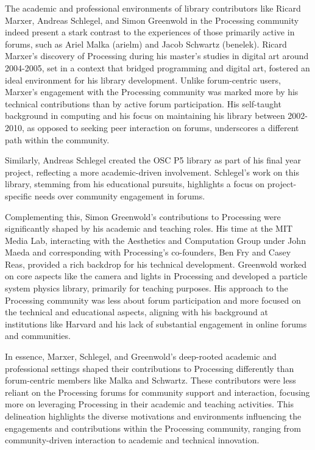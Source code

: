 The academic and professional environments of library contributors like Ricard Marxer, Andreas Schlegel, and Simon Greenwold in the Processing community indeed present a stark contrast to the experiences of those primarily active in forums, such as Ariel Malka (arielm) and Jacob Schwartz (benelek).
Ricard Marxer's discovery of Processing during his master's studies in digital art around 2004-2005, set in a context that bridged programming and digital art, fostered an ideal environment for his library development. Unlike forum-centric users, Marxer's engagement with the Processing community was marked more by his technical contributions than by active forum participation. His self-taught background in computing and his focus on maintaining his library between 2002-2010, as opposed to seeking peer interaction on forums, underscores a different path within the community​​​​.

Similarly, Andreas Schlegel created the OSC P5 library as part of his final year project, reflecting a more academic-driven involvement. Schlegel's work on this library, stemming from his educational pursuits, highlights a focus on project-specific needs over community engagement in forums​​.

Complementing this, Simon Greenwold's contributions to Processing were significantly shaped by his academic and teaching roles. His time at the MIT Media Lab, interacting with the Aesthetics and Computation Group under John Maeda and corresponding with Processing's co-founders, Ben Fry and Casey Reas, provided a rich backdrop for his technical development. Greenwold worked on core aspects like the camera and lights in Processing and developed a particle system physics library, primarily for teaching purposes. His approach to the Processing community was less about forum participation and more focused on the technical and educational aspects, aligning with his background at institutions like Harvard and his lack of substantial engagement in online forums and communities​​​​.

In essence, Marxer, Schlegel, and Greenwold's deep-rooted academic and professional settings shaped their contributions to Processing differently than forum-centric members like Malka and Schwartz. These contributors were less reliant on the Processing forums for community support and interaction, focusing more on leveraging Processing in their academic and teaching activities. This delineation highlights the diverse motivations and environments influencing the engagements and contributions within the Processing community, ranging from community-driven interaction to academic and technical innovation.


